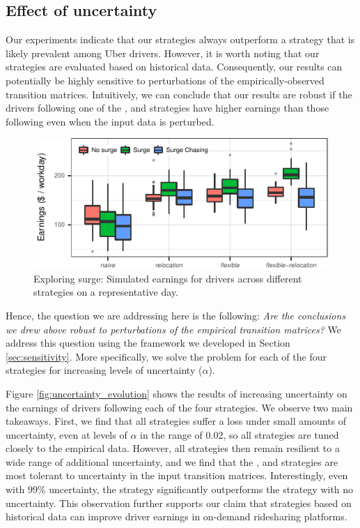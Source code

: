 \subsection{Effect of uncertainty}
\label{sec:effect_of_uncertainty} 
Our experiments indicate that our strategies always outperform a {\naive} strategy that is likely prevalent 
among Uber drivers. However, it is worth noting that our strategies are evaluated based on historical data. Consequently, 
our results can potentially be highly sensitive to perturbations of the empirically-observed transition matrices. 
Intuitively, we can conclude that our results are robust if
the drivers following one of the {\relocation}, {\flexible} and {\relocationflexible} strategies
have higher earnings than those following {\naive} even when the input data is perturbed.
\begin{figure}
	\includegraphics{figures/simulated_earnings.pdf}
	\caption{Exploring surge: Simulated earnings for drivers across different strategies on a representative day.}
	\label{fig:simulated_earnings}
\end{figure}

Hence, the question we are addressing here is the following: 
\textit{Are the conclusions we drew above robust to perturbations of the empirical transition matrices?} We address this question using
the framework we developed in Section \ref{sec:sensitivity}. More specifically, 
we solve the {\robustproblem} problem for each of the four strategies for increasing levels of uncertainty ($\alpha$).

Figure \ref{fig:uncertainty_evolution} shows the results of increasing uncertainty on the earnings of drivers 
   following each of the four strategies.  We observe two main takeaways.  First, we find that all strategies
   suffer a loss under small amounts of uncertainty, even at levels of $\alpha$ in the range of 0.02, so all
   strategies are tuned closely to the empirical data.  
However, all strategies then remain resilient to a wide range of additional uncertainty, and we find that
   the {\relocation}, {\flexible} and {\relocationflexible} strategies are most tolerant to uncertainty 
  in the input transition matrices. 
Interestingly, even with 99\% uncertainty, the {\relocationflexible} strategy significantly outperforms 
  the {\naive} strategy with no uncertainty.
This observation further supports our claim that strategies based on historical data can improve driver 
  earnings in on-demand ridesharing platforms. 


